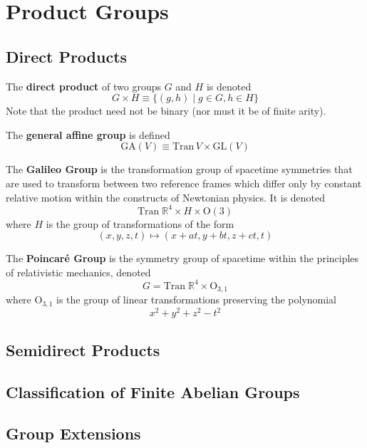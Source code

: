 \section{Product Groups} 

\subsection{Direct Products}

  \begin{definition}
    The \textbf{direct product} of two groups $G$ and $H$ is denoted
    \begin{equation}
      G \times H \equiv \{ (g, h)\;|\; g \in G, h \in H \}
    \end{equation}
    Note that the product need not be binary (nor must it be of finite arity). 
  \end{definition}

  \begin{example}
    The \textbf{general affine group} is defined 
    \begin{equation}
      \text{GA}(V) \equiv \text{Tran}\,V \times \text{GL}(V)
    \end{equation}
  \end{example}

  \begin{example}
    The \textbf{Galileo Group} is the transformation group of spacetime symmetries that are used to transform between two reference frames which differ only by constant relative motion within the constructs of Newtonian physics. It is denoted 
    \begin{equation}
      \text{Tran}\;\mathbb{R}^{4} \times H \times \text{O} (3)
    \end{equation}
    where $H$ is the group of transformations of the form 
    \begin{equation}
      (x, y, z, t) \longmapsto (x+at, y+bt, z+ct, t)
    \end{equation}
  \end{example}

  \begin{example}
    The \textbf{Poincaré Group} is the symmetry group of spacetime within the principles of relativistic mechanics, denoted
    \begin{equation}
      G = \text{Tran}\; \mathbb{R}^{4} \times \text{O}_{3,1}
    \end{equation}
    where O$_{3,1}$ is the group of linear transformations preserving the polynomial 
    \begin{equation}
      x^{2} + y^{2} + z^{2} - t^{2}
    \end{equation}
  \end{example} 

\subsection{Semidirect Products} 

\subsection{Classification of Finite Abelian Groups} 

\subsection{Group Extensions}


